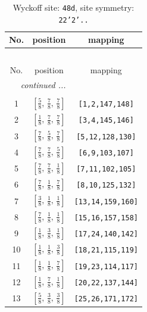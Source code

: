 \documentclass[fleqn,8pt]{jsarticle}
\begin{document}
\begin{longtable}{ccc}
\caption{Wyckoff site: {\tt 48d}, site symmetry: {\tt 22'2'..}}
 \\
 \hline \hline
No. & position & mapping \\ \hline \endfirsthead

\multicolumn{2}{l}{\tablename\ \thetable{}} \\
 \hline \hline
No. & position & mapping \\ \hline \endhead

 \hline \hline
\multicolumn{2}{r}{\footnotesize\it continued ...} \\ \endfoot

 \hline \hline
\multicolumn{2}{r}{} \\ \endlastfoot

1 & $\left[ \frac{5}{8},\, \frac{7}{8},\, \frac{7}{8} \right]$ & {\tt [1,2,147,148]} \\ \hline
2 & $\left[ \frac{1}{8},\, \frac{7}{8},\, \frac{7}{8} \right]$ & {\tt [3,4,145,146]} \\ \hline
3 & $\left[ \frac{7}{8},\, \frac{5}{8},\, \frac{7}{8} \right]$ & {\tt [5,12,128,130]} \\ \hline
4 & $\left[ \frac{7}{8},\, \frac{7}{8},\, \frac{5}{8} \right]$ & {\tt [6,9,103,107]} \\ \hline
5 & $\left[ \frac{7}{8},\, \frac{7}{8},\, \frac{1}{8} \right]$ & {\tt [7,11,102,105]} \\ \hline
6 & $\left[ \frac{7}{8},\, \frac{1}{8},\, \frac{7}{8} \right]$ & {\tt [8,10,125,132]} \\ \hline
7 & $\left[ \frac{3}{8},\, \frac{1}{8},\, \frac{1}{8} \right]$ & {\tt [13,14,159,160]} \\ \hline
8 & $\left[ \frac{7}{8},\, \frac{1}{8},\, \frac{1}{8} \right]$ & {\tt [15,16,157,158]} \\ \hline
9 & $\left[ \frac{1}{8},\, \frac{3}{8},\, \frac{1}{8} \right]$ & {\tt [17,24,140,142]} \\ \hline
10 & $\left[ \frac{1}{8},\, \frac{1}{8},\, \frac{3}{8} \right]$ & {\tt [18,21,115,119]} \\ \hline
11 & $\left[ \frac{1}{8},\, \frac{1}{8},\, \frac{7}{8} \right]$ & {\tt [19,23,114,117]} \\ \hline
12 & $\left[ \frac{1}{8},\, \frac{7}{8},\, \frac{1}{8} \right]$ & {\tt [20,22,137,144]} \\ \hline
13 & $\left[ \frac{5}{8},\, \frac{3}{8},\, \frac{3}{8} \right]$ & {\tt [25,26,171,172]} \\ \hline

\end{longtable}
\end{document}
